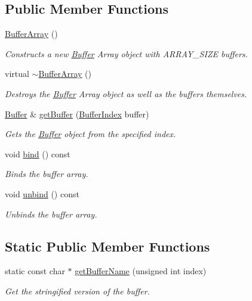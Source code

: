 \subsection*{Public Member Functions}
\begin{DoxyCompactItemize}
\item 
\hyperlink{classpcs_1_1rend_1_1BufferArray_a8e4885f9616165139b318a1b879691e5}{Buffer\+Array} ()
\begin{DoxyCompactList}\small\item\em Constructs a new \hyperlink{classpcs_1_1rend_1_1Buffer}{Buffer} Array object with A\+R\+R\+A\+Y\+\_\+\+S\+I\+ZE buffers. \end{DoxyCompactList}\item 
virtual \hyperlink{classpcs_1_1rend_1_1BufferArray_a4492755723fc99752c811bfe7520d993}{$\sim$\+Buffer\+Array} ()
\begin{DoxyCompactList}\small\item\em Destroys the \hyperlink{classpcs_1_1rend_1_1Buffer}{Buffer} Array object as well as the buffers themselves. \end{DoxyCompactList}\item 
\hyperlink{classpcs_1_1rend_1_1Buffer}{Buffer} \& \hyperlink{classpcs_1_1rend_1_1BufferArray_ad4b43fddb8e19fcaa6fbb8ff80a64a94}{get\+Buffer} (\hyperlink{namespacepcs_1_1rend_a731e43a479c7b7b61dd23586494ee61b}{Buffer\+Index} buffer)
\begin{DoxyCompactList}\small\item\em Gets the \hyperlink{classpcs_1_1rend_1_1Buffer}{Buffer} object from the specified index. \end{DoxyCompactList}\item 
void \hyperlink{classpcs_1_1rend_1_1BufferArray_ab170f51886678c0c027acdf604915eb7}{bind} () const
\begin{DoxyCompactList}\small\item\em Binds the buffer array. \end{DoxyCompactList}\item 
void \hyperlink{classpcs_1_1rend_1_1BufferArray_a8c00f92e0911c209b26cf99fa2920d95}{unbind} () const
\begin{DoxyCompactList}\small\item\em Unbinds the buffer array. \end{DoxyCompactList}\end{DoxyCompactItemize}
\subsection*{Static Public Member Functions}
\begin{DoxyCompactItemize}
\item 
static const char $\ast$ \hyperlink{classpcs_1_1rend_1_1BufferArray_a7ed1705d18349b1e7a08b769f233546a}{get\+Buffer\+Name} (unsigned int index)
\begin{DoxyCompactList}\small\item\em Get the stringified version of the buffer. \end{DoxyCompactList}\end{DoxyCompactItemize}
